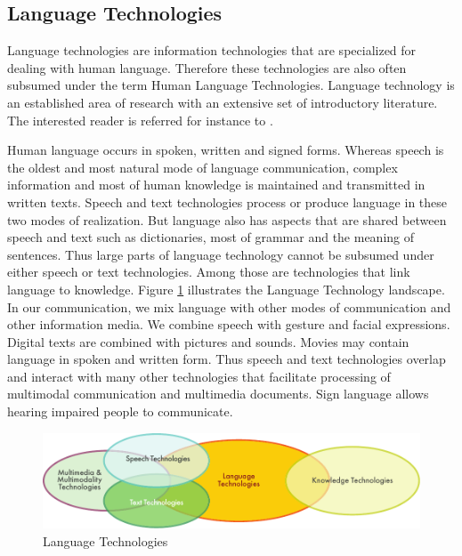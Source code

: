 \begin{multicols}{2}

\subsection{Language Technologies}
Language technologies are information technologies that are
specialized for dealing with human language. Therefore these
technologies are also often subsumed under the term Human Language
Technologies. Language technology is an established area of research with an extensive set of introductory literature. The interested reader is referred for instance to \cite{hltsurvey96, varile1997survey}.

Human language occurs in spoken, written and signed
forms. Whereas speech is the oldest and most natural mode of language
communication, complex information and most of human knowledge is
maintained and transmitted in written texts. Speech and text
technologies process or produce language in these two modes of
realization. But language also has aspects that are shared between
speech and text such as dictionaries, most of grammar and the meaning
of sentences. Thus large parts of language technology cannot be
subsumed under either speech or text technologies. Among those are
technologies that link language to knowledge. Figure \ref{fig:languagetechnoEng} 
illustrates the Language Technology landscape. In our communication,
we mix language with other modes of communication and other
information media. We combine speech with gesture and facial
expressions. Digital texts are combined with pictures and
sounds. Movies may contain language in spoken and written form. Thus
speech and text technologies overlap and interact with many other
technologies that facilitate processing of multimodal communication
and multimedia documents. Sign language allows hearing impaired people to communicate.

\begin{figure}[htb]
\begin{center}
 \includegraphics[width=\textwidth]{../_media/english/language_technologies} 
\caption{Language Technologies}
\label{fig:languagetechnoEng}
\end{center}
\end{figure}


\end{multicols}
